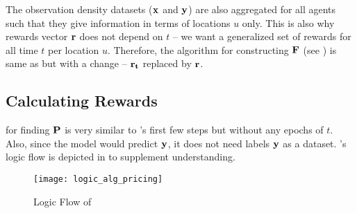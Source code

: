 The observation density datasets ($\mathbf{x}$ and $\mathbf{y}$) are also aggregated for all agents such that they give information in terms of locations $u$ only. This is also why rewards vector $\mathbf{r}$ does not depend on $t$ -- we want a generalized set of rewards for all time $t$ per location $u$. Therefore, the algorithm for constructing $\mathbf{F}$ (see ) is same as  but with a change -- $\mathbf{r_t}$ replaced by $\mathbf{r}$.

\subsection{Calculating Rewards} \label{sec:Calculating Rewards}
 for finding $\mathbf{P}$ is very similar to 's first few steps but without any epochs of $t$. Also, since the model would predict $\mathbf{y}$, it does not need labels $\mathbf{y}$ as a dataset. 's logic flow is depicted in  to supplement understanding.
\begin{figure}[!htbp]
    \centering
    \texttt{[image: logic\_alg\_pricing]}
    \caption{Logic Flow of }
    \label{fig:Logic Flow of Algorithm Pricing Problem}
\end{figure}
